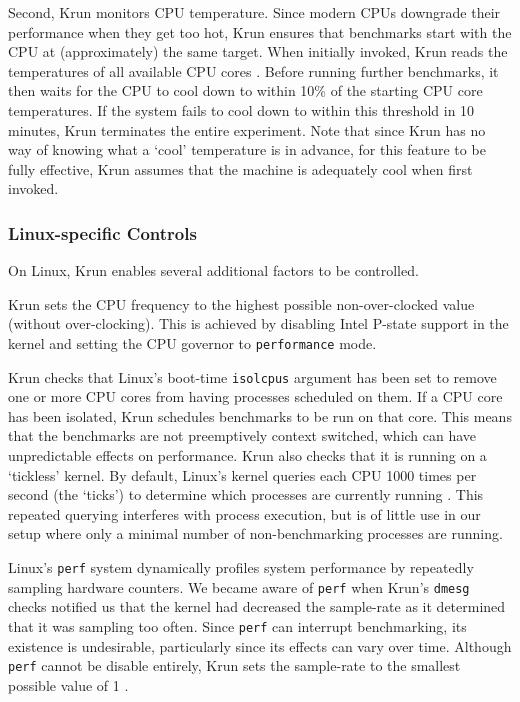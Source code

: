 \documentclass[10pt,preprint]{sigplanconf}
\newcommand{\krun}{Krun\xspace}
\begin{document}
Second, \krun monitors CPU temperature. Since modern CPUs downgrade their
performance when they get too hot, \krun
ensures that benchmarks start with the CPU at (approximately) the same target.
When initially invoked, \krun reads the temperatures of all available CPU cores
. Before running
further benchmarks, it then waits for the CPU to cool down to within 10\%{} of
the starting CPU core temperatures. If the system fails to cool down to within
this threshold in 10 minutes, \krun terminates the entire experiment. Note that
since \krun has no way of knowing what a `cool' temperature is in advance, for
this feature to be fully effective, \krun assumes that the machine is adequately
cool when first invoked.


\subsubsection{Linux-specific Controls}

On Linux, \krun enables several additional factors to be controlled.

\krun sets the CPU frequency to the highest possible non-over-clocked value
(without over-clocking). This is achieved by disabling Intel P-state support in
the kernel  and setting the CPU governor to \texttt{performance} mode.

\krun checks that Linux's boot-time \texttt{isolcpus} argument has been set to
remove one or more CPU cores from having processes scheduled on them. If a CPU
core has been isolated, \krun {} schedules benchmarks to be
run on that core. This means that the benchmarks are not preemptively context
switched, which can have unpredictable effects on performance. \krun also checks
that it is running on a `tickless' kernel. By default, Linux's kernel queries
each CPU 1000 times per second (the `ticks') to determine which processes are
currently running . This repeated querying
interferes with process execution, but is of little use in our setup where only
a minimal number of non-benchmarking processes are running.

Linux's \texttt{perf} system dynamically profiles system performance by
repeatedly sampling hardware counters. We became aware of \texttt{perf} when
\krun's \texttt{dmesg} checks notified us that the kernel had decreased the
sample-rate as it determined that it was sampling too often. Since \texttt{perf}
can interrupt benchmarking, its existence is undesirable, particularly since its
effects can vary over time. Although \texttt{perf} cannot be disable entirely,
\krun sets the sample-rate to the smallest possible value of 1 .
\end{document}
